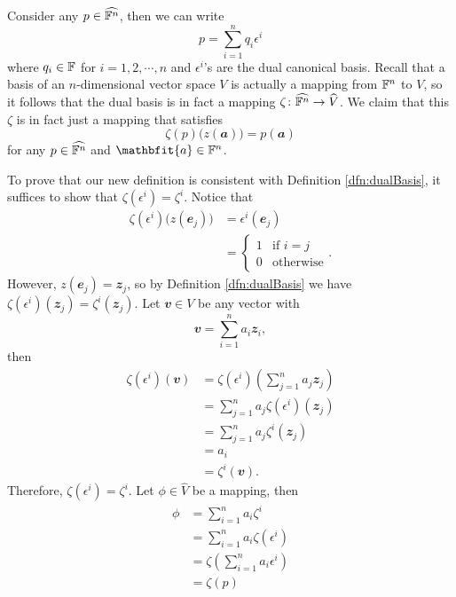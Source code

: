 \documentclass[math, code]{amznotes}
\theoremstyle{remark}
\begin{document}
Consider any $p \in \widehat{\mathbb{F}^n}$, then we can write
\begin{equation*}
    p = \sum_{i = 1}^{n}q_i\epsilon^i
\end{equation*} 
where $q_i \in \mathbb{F}$ for $i = 1, 2, \cdots, n$ and $\epsilon^i$'s are the dual canonical basis. Recall that a basis of an $n$-dimensional vector space $V$ is actually a mapping from $\mathbb{F}^n$ to $V$, so it follows that the dual basis is in fact a mapping $\zeta \colon \widehat{\mathbb{F}^n} \to \widehat{V}$. We claim that this $\zeta$ is in fact just a mapping that satisfies 
\begin{equation*}
    \zeta(p)\bigl(z(\mathbfit{a})\bigr) = p(\mathbfit{a})
\end{equation*}
for any $p \in \widehat{\mathbb{F}^n}$ and $\mathbfit{a} \in \F^n$. 

To prove that our new definition is consistent with Definition \ref{dfn:dualBasis}, it suffices to show that $\zeta(\epsilon^i) = \zeta^i$. Notice that
\begin{align*}
    \zeta(\epsilon^i)\bigl(z(\mathbfit{e}_j)\bigr) & = \epsilon^i(\mathbfit{e}_j) \\
    & = \begin{cases}
        1 & \textrm{if } i = j \\
        0 & \textrm{otherwise}
    \end{cases}.
\end{align*}
However, $z(\mathbfit{e}_j) = \mathbfit{z}_j$, so by Definition \ref{dfn:dualBasis} we have $\zeta(\epsilon^i)(\mathbfit{z}_j) = \zeta^i(\mathbfit{z}_j)$. Let $\mathbfit{v} \in V$ be any vector with
\begin{equation*}
    \mathbfit{v} = \sum_{i = 1}^{n}a_i\mathbfit{z}_i,
\end{equation*}
then 
\begin{align*}
    \zeta(\epsilon^i)(\mathbfit{v}) & = \zeta(\epsilon^i)\left(\sum_{j = 1}^{n}a_j\mathbfit{z}_j\right) \\
    & = \sum_{j = 1}^{n}a_j\zeta(\epsilon^i)(\mathbfit{z}_j) \\
    & = \sum_{j = 1}^{n}a_j\zeta^i(\mathbfit{z}_j) \\
    & = a_i \\
    & = \zeta^i(\mathbfit{v}).
\end{align*}
Therefore, $\zeta(\epsilon^i) = \zeta^i$. Let $\phi \in \widehat{V}$ be a mapping, then
\begin{align*}
    \phi & = \sum_{i = 1}^{n}a_i\zeta^i \\
    & = \sum_{i = 1}^{n}a_i\zeta(\epsilon^i) \\
    & = \zeta\left(\sum_{i = 1}^{n}a_i\epsilon^i\right) \\
    & = \zeta(p)
\end{align*}
\end{document}
